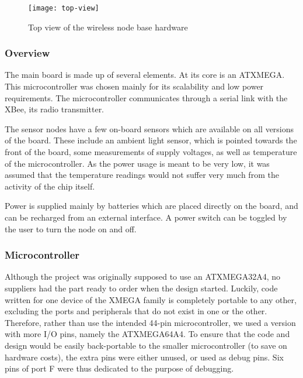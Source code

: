 \begin{figure}[h]
  \begin{center}
    \texttt{[image: top-view]}
  \end{center}
  \caption{Top view of the wireless node base hardware}
  \label{fig:base-topview}
\end{figure}

\subsubsection{Overview}

The main board is made up of several elements. At its core is an ATXMEGA. This
microcontroller was chosen mainly for its scalability and low power
requirements. The microcontroller communicates through a serial link with the
XBee, its radio transmitter.

The sensor nodes have a few on-board sensors which are available on all versions
of the board. These include an ambient light sensor, which is pointed towards
the front of the board, some measurements of supply voltages, as well as
temperature of the microcontroller. As the power usage is meant to be very low,
it was assumed that the temperature readings would not suffer very much from
the activity of the chip itself.

Power is supplied mainly by batteries which are placed directly on the board,
and can be recharged from an external interface. A power switch can be toggled
by the user to turn the node on and off.

\subsubsection{Microcontroller}

Although the project was originally supposed to use an ATXMEGA32A4, no suppliers
had the part ready to order when the design started. Luckily, code written for
one device of the XMEGA family is completely portable to any other, excluding
the ports and peripherals that do not exist in one or the other. Therefore,
rather than use the intended 44-pin microcontroller, we used a version with more
I/O pins, namely the ATXMEGA64A4. To ensure that the code and design would be
easily back-portable to the smaller microcontroller (to save on hardware costs),
the extra pins were either unused, or used as debug pins. Six pins of port F
were thus dedicated to the purpose of debugging. 

